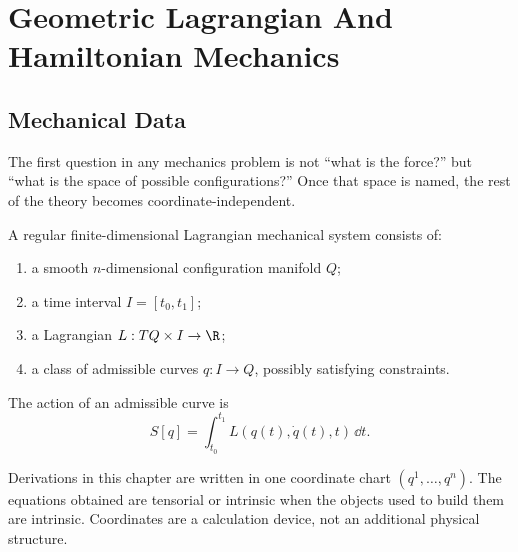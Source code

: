 \chapter{Geometric Lagrangian And Hamiltonian Mechanics}
\label{chap:lag-ham}

\section{Mechanical Data}
\label{sec:lag-ham-mechanical-data}

The first question in any mechanics problem is not ``what is the force?'' but
``what is the space of possible configurations?'' Once that space is named, the
rest of the theory becomes coordinate-independent.

\begin{definition}
A regular finite-dimensional Lagrangian mechanical system consists of:
\begin{enumerate}
\item a smooth \(n\)-dimensional configuration manifold \(Q\);
\item a time interval \(I=[t_0,t_1]\);
\item a Lagrangian \(L:TQ\times I\to \R\);
\item a class of admissible curves \(q:I\to Q\), possibly satisfying constraints.
\end{enumerate}
The action of an admissible curve is
\[
  S[q]=\int_{t_0}^{t_1} L(q(t),\dot q(t),t)\,\dd t.
\]
\end{definition}

\begin{assumption}
Derivations in this chapter are written in one coordinate chart
\((q^1,\ldots,q^n)\). The equations obtained are tensorial or intrinsic when
the objects used to build them are intrinsic. Coordinates are a calculation
device, not an additional physical structure.
\end{assumption}

